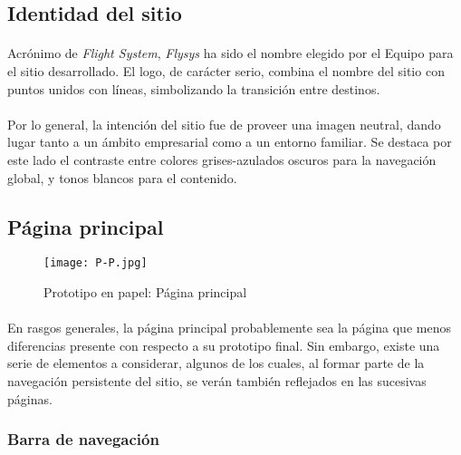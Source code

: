 \documentclass[spanish]{article}
\begin{document}
	\subsection{Identidad del sitio}
	\paragraph{} Acrónimo de \textit{Flight System}, \textit{Flysys} ha sido el nombre elegido por el Equipo para el sitio desarrollado. El logo, de carácter serio, combina el nombre del sitio con puntos unidos con líneas, simbolizando la transición entre destinos. 
	\paragraph{} Por lo general, la intención del sitio fue de proveer una imagen neutral, dando lugar tanto a un ámbito empresarial como a un entorno familiar. Se destaca por este lado el contraste entre colores grises-azulados oscuros para la navegación global, y tonos blancos para el contenido.  
	\subsection{Página principal}
			\begin{figure}[h]
				\centering
				\texttt{[image: P-P.jpg]}
				\caption{Prototipo en papel: Página principal}
			\end{figure}
	\paragraph{} En rasgos generales, la página principal probablemente sea la página que menos diferencias presente con respecto a su prototipo final. Sin embargo, existe una serie de elementos a considerar, algunos de los cuales, al formar parte de la navegación persistente del sitio, se verán también reflejados en las sucesivas páginas.
	\subsubsection{Barra de navegación}
\end{document}
